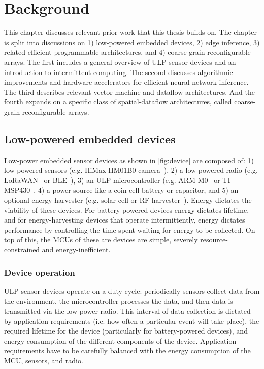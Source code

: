 \chapter{Background}
\label{chapter:background}

This chapter discusses relevant prior work that this thesis builds on.
% 
The chapter is split into discussions on 1) low-powered embedded devices, 2) edge inference, 3) related efficient programmable architectures, and 4) coarse-grain reconfigurable arrays.
% 
The first includes a general overview of ULP sensor devices and an introduction to intermittent computing.
% 
The second discusses algorithmic improvements and hardware accelerators for efficient neural network inference.
% 
The third describes relevant vector machine and dataflow architectures.
% 
And the fourth expands on a specific class of spatial-dataflow architectures, called coarse-grain reconfigurable arrays.
% 

\figDevice
\section{Low-powered embedded devices}

Low-power embedded sensor devices as shown in \autoref{fig:device} are composed of: 1) low-powered sensors (e.g. HiMax HM01B0 camera~\cite{hm01b0}), 2) a low-powered radio (e.g. LoRaWAN~\cite{lorawan} or BLE~\cite{ble}), 3) an ULP microcontroller (e.g. ARM M0~\cite{cortexm0} or TI-MSP430~\cite{msp430fr5994}, 4) a power source like a coin-cell battery or capacitor, and 5) an optional energy harvester (e.g. solar cell or RF harvester~\cite{powercast}).
% 
Energy dictates the viability of these devices.
% 
For battery-powered devices energy dictates lifetime, and for energy-harvesting devices that operate intermittently, energy dictates performance by controlling the time spent waiting for energy to be collected.
% 
On top of this, the MCUs of these are devices are simple, severely resource-constrained and energy-inefficient.

\subsection{Device operation}
% 
ULP sensor devices operate on a duty cycle: periodically sensors collect data from the environment, the microcontroller processes the data, and then data is transmitted via the low-power radio.
% 
This interval of data collection is dictated by application requirements (i.e. how often a particular event will take place), the required lifetime for the device (particularly for battery-powered devices), and energy-consumption of the different components of the device.
% 
% 
Application requirements have to be carefully balanced with the energy consumption of the MCU, sensors, and radio.

